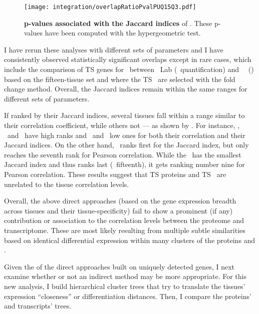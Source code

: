 \begin{figure}[!ht]
    \texttt{[image: integration/overlapRatioPvalPUQ15Q3.pdf]}\centering
    \caption[p-values associated with the Jaccard indices]{%
\label{fig:JaccardPvalues}\label{fig:pJacquard}%
    \textbf{p-values associated with the Jaccard indices} of .
    These p-values have been computed with the hypergeometric test.}
    \vspace{-3mm}
\end{figure}

I have rerun these analyses with different sets of parameters
and I have consistently observed statistically significant overlaps
except in rare cases,
which include the comparison of \gls{TS} genes for \Bladder\
between \pandey\ Lab (\PPKM\ quantification) and \uhlen\ \etal\ (\htseq)
based on the fifteen-tissue set and where the \gls{TS} \mRNAs\ are selected
with the fold change method.
Overall, the Jaccard indices remain within the same ranges
for different sets of parameters.\mybr\

If ranked by their Jaccard indices,
several tissues fall within a range similar to their correlation coefficient,
while others not --- as shown by \Cref{fig:compCorJind}.
For instance, \Liver, \Testis\ and \Pancreas\ have high ranks
and \Bladder\ and \Gallbladder\ low ones
for both their correlation and their Jaccard indices.
On the other hand,
\Kidney\ ranks first for the Jaccard index,
but only reaches the seventh rank for Pearson correlation.
While the \Rectum\ has the smallest Jaccard index
and thus ranks last (\ie\ fifteenth),
it gets ranking number nine for Pearson correlation.
These results suggest that
\gls{TS} proteins and \gls{TS} \mRNAs\ are unrelated to
the tissue correlation levels.\mybr\

Overall, the above direct approaches
(based on the gene expression breadth across tissues and their tissue-specificity)
fail to show a prominent (if any) contribution or association
to the correlation levels between the proteome and transcriptome.
These are most likely resulting
from multiple subtle similarities
based on identical differential expression
within many clusters of the proteins and \mRNAs{}.\mybr\

Given the  of the direct approaches built on uniquely detected genes,
I next examine whether or not an indirect method may be more appropriate.
For this new analysis,
I build hierarchical cluster trees that try to translate
the tissues' expression \enquote{closeness} or differentiation distances.
Then, I compare the proteins' and transcripts' trees.\mybr\

